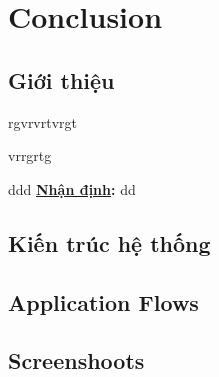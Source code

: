 \chapter{Conclusion}

\section{Giới thiệu}

rgvrvrtvrgt \par
vrrgrtg \par

ddd \textbf{\underline{Nhận định}:} dd

\section{Kiến trúc hệ thống}

\section{Application Flows}

\section{Screenshoots}